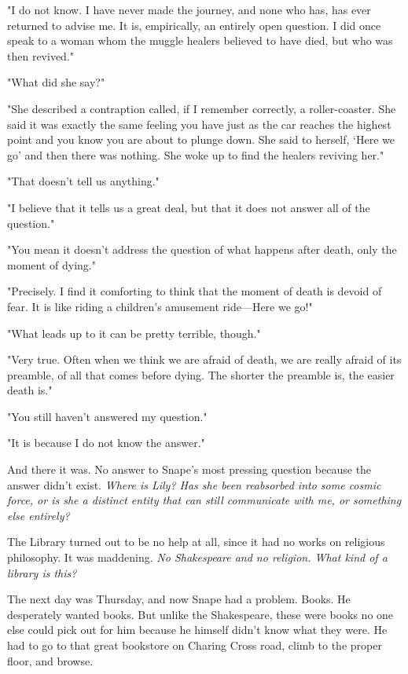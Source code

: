 "I do not know. I have never made the journey, and none who has, has ever returned to advise me. It is, empirically, an entirely open question. I did once speak to a woman whom the muggle healers believed to have died, but who was then revived."

"What did she say?"

"She described a contraption called, if I remember correctly, a roller-coaster. She said it was exactly the same feeling you have just as the car reaches the highest point and you know you are about to plunge down. She said to herself, `Here we go{\el}' and then there was nothing. She woke up to find the healers reviving her."

"That doesn't tell us anything."

"I believe that it tells us a great deal, but that it does not answer all of the question."

"You mean it doesn't address the question of what happens after death, only the moment of dying."

"Precisely. I find it comforting to think that the moment of death is devoid of fear. It is like riding a children's amusement ride—Here we go!"

"What leads up to it can be pretty terrible, though."

"Very true. Often when we think we are afraid of death, we are really afraid of its preamble, of all that comes before dying. The shorter the preamble is, the easier death is."

"You still haven't answered my question."

"It is because I do not know the answer."

And there it was. No answer to Snape's most pressing question because the answer didn't exist. \emph{Where is Lily? Has she been reabsorbed into some cosmic force, or is she a distinct entity that can still communicate with me, or something else entirely?}

The Library turned out to be no help at all, since it had no works on religious philosophy. It was maddening. \emph{No Shakespeare and no religion. What kind of a library is this?}

The next day was Thursday, and now Snape had a problem. Books. He desperately wanted books. But unlike the Shakespeare, these were books no one else could pick out for him because he himself didn't know what they were. He had to go to that great bookstore on Charing Cross road, climb to the proper floor, and browse.

